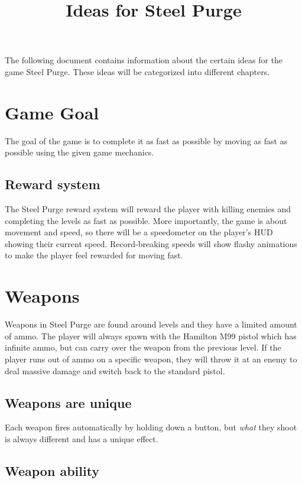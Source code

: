 \documentclass[12pt]{article}
\title{Ideas for Steel Purge}
\begin{document}
\maketitle{}

The following document contains information about the certain ideas for the game Steel Purge. These ideas will be categorized into different chapters.

\section{Game Goal}

The goal of the game is to complete it as fast as possible by moving as fast as possible using the given game mechanics. 

\subsection{Reward system}

The Steel Purge reward system will reward the player with killing enemies and completing the levels as fast as possible. More importantly, the game is about movement and speed, so there will be a speedometer on the player's HUD showing their current speed. Record-breaking speeds will show flashy animations to make the player feel rewarded for moving fast. 

\section{Weapons}

Weapons in Steel Purge are found around levels and they have a limited amount of ammo. The player will always spawn with the Hamilton M99 pistol which has infinite ammo, but can carry over the weapon from the previous level. If the player runs out of ammo on a specific weapon, they will throw it at an enemy to deal massive damage and switch back to the standard pistol. 

\subsection{Weapons are unique}

Each weapon fires automatically by holding down a button, but \emph{what} they shoot is always different and has a unique effect. 

\subsection{Weapon ability}
\end{document}
